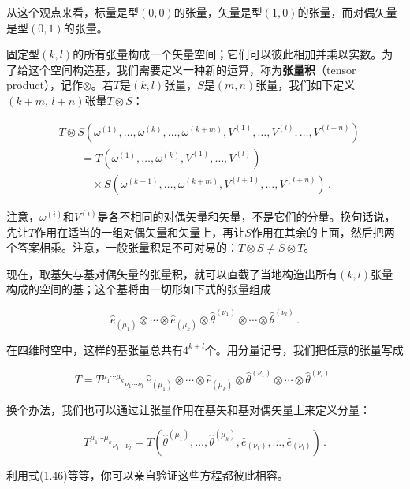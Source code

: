 从这个观点来看，标量是型$(0,0)$的张量，矢量是型$(1,0)$的张量，而对偶矢量是型$(0,1)$的张量。

固定型$(k,l)$的所有张量构成一个矢量空间；它们可以彼此相加并乘以实数。为了给这个空间构造基，我们需要定义一种新的运算，称为\textbf{张量积}（tensor product），记作$\otimes$。若$T$是$(k,l)$张量，$S$是$(m,n)$张量，我们如下定义$(k+m,\,l+n)$张量$T\otimes S$：

\begin{align*}
&T\otimes S(\omega^{(1)},\ldots,\omega^{(k)},\ldots,\omega^{(k+m)},V^{(1)},\ldots,V^{(l)},\ldots,V^{(l+n)})\\
&\qquad =T(\omega^{(1)},\ldots,\omega^{(k)},V^{(1)},\ldots,V^{(l)})\\
&\qquad\quad\times S(\omega^{(k+1)},\ldots,\omega^{(k+m)},V^{(l+1)},\ldots,V^{(l+n)})\,.
\tag{1.58}
\end{align*}

注意，$\omega^{(i)}$和$V^{(i)}$是各不相同的对偶矢量和矢量，不是它们的分量。换句话说，先让$T$作用在适当的一组对偶矢量和矢量上，再让$S$作用在其余的上面，然后把两个答案相乘。注意，一般张量积是不可对易的：$T\otimes S\neq S\otimes T$。

现在，取基矢与基对偶矢量的张量积，就可以直截了当地构造出所有$(k,l)$张量构成的空间的基；这个基将由一切形如下式的张量组成

\begin{equation*}
\hat{e}_{(\mu_1)}\otimes\cdots\otimes\hat{e}_{(\mu_k)}
\otimes\hat{\theta}^{(\nu_1)}\otimes\cdots\otimes\hat{\theta}^{(\nu_l)}\,.
\tag{1.59}
\end{equation*}

在四维时空中，这样的基张量总共有$4^{k+l}$个。用分量记号，我们把任意的张量写成

\begin{equation*}
T=T^{\mu_1\cdots\mu_k}{}_{\nu_1\cdots\nu_l}\,
\hat{e}_{(\mu_1)}\otimes\cdots\otimes\hat{e}_{(\mu_k)}
\otimes\hat{\theta}^{(\nu_1)}\otimes\cdots\otimes\hat{\theta}^{(\nu_l)}\,.
\tag{1.60}
\end{equation*}

换个办法，我们也可以通过让张量作用在基矢和基对偶矢量上来定义分量：

\begin{equation*}
T^{\mu_1\cdots\mu_k}{}_{\nu_1\cdots\nu_l}
=T(\hat{\theta}^{(\mu_1)},\ldots,\hat{\theta}^{(\mu_k)},\hat{e}_{(\nu_1)},\ldots,\hat{e}_{(\nu_l)})\,.
\tag{1.61}
\end{equation*}

利用式(1.46)等等，你可以亲自验证这些方程都彼此相容。

